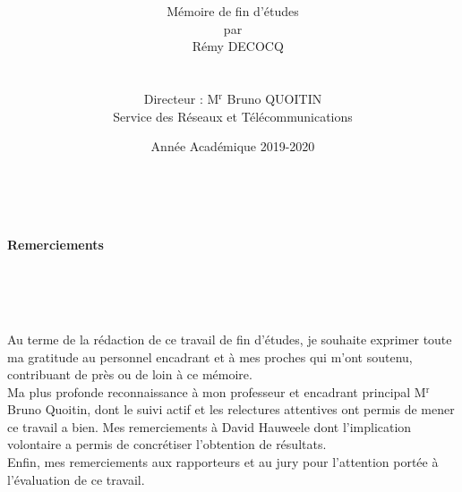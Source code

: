 \documentclass[]{report}
\begin{document}
\title{
\vspace{2cm}
\noindent{}
}



\author{
\LARGE{Mémoire de fin d'études}\\
\LARGE{par}\\
~\vspace{0.4cm}
\LARGE{Rémy DECOCQ}\\
~\\
~\\
\Large
Directeur : M$^{\text{r}}$ Bruno QUOITIN\\
Service des Réseaux et Télécommunications
\normalsize
}

\date{
\vspace{10cm}
\Large
Année Académique 2019-2020}

\maketitle          

\thispagestyle{empty}   

\newpage
~
\newpage

\begin{center}
\textbf{\LARGE Remerciements}\\
\end{center}
~\\
~\\
~\\
\Large
\par Au terme de la rédaction de ce travail de fin d'études, je souhaite exprimer toute ma gratitude au personnel encadrant et à mes proches qui m'ont soutenu, contribuant de près ou de loin à ce mémoire.\\

Ma plus profonde reconnaissance à mon professeur et encadrant principal M$^{\text{r}}$ Bruno Quoitin, dont le suivi actif et les relectures attentives ont permis de mener ce travail a bien. Mes remerciements à David Hauweele dont l'implication volontaire a permis de concrétiser l'obtention de résultats.\\

Enfin, mes remerciements aux rapporteurs et au jury pour l'attention portée à l'évaluation de ce travail.
\normalsize
\end{document}
